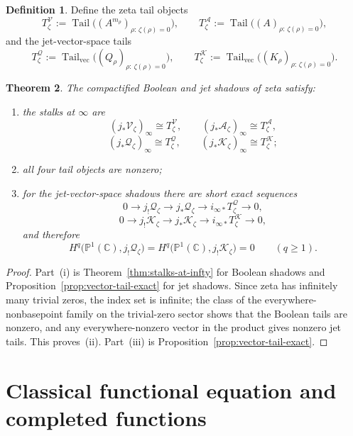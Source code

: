 \documentclass[11pt,a4paper]{article}
\numberwithin{equation}{section}
\newtheorem{theorem}{Theorem}[section]
\theoremstyle{definition}
\newtheorem{definition}[theorem]{Definition}
\theoremstyle{remark}
\DeclareMathOperator{\Tail}{Tail}
\newcommand{\CC}{\mathbb C}
\newcommand{\PP}{\mathbb P}
\newcommand{\cV}{\mathcal V}
\newcommand{\cA}{\mathcal A}
\newcommand{\cQ}{\mathcal Q}
\newcommand{\cK}{\mathcal K}
\begin{document}
\begin{definition}
Define the zeta tail objects
\[
T_\zeta^{\cV}:=\Tail\bigl((A^{m_\rho})_{\rho:\,\zeta(\rho)=0}\bigr),
\qquad
T_\zeta^{\cA}:=\Tail\bigl((A)_{\rho:\,\zeta(\rho)=0}\bigr),
\]
and the jet-vector-space tails
\[
T_\zeta^{\cQ}:=\Tail_{\mathrm{vec}}\bigl((Q_\rho)_{\rho:\,\zeta(\rho)=0}\bigr),
\qquad
T_\zeta^{\cK}:=\Tail_{\mathrm{vec}}\bigl((K_\rho)_{\rho:\,\zeta(\rho)=0}\bigr).
\]
\end{definition}

\begin{theorem}\label{thm:zeta-tail}
The compactified Boolean and jet shadows of zeta satisfy:
\begin{enumerate}[label=(\roman*)]
\item the stalks at $\infty$ are
\[
(j_*\cV_\zeta)_\infty\cong T_\zeta^{\cV},
\qquad
(j_*\cA_\zeta)_\infty\cong T_\zeta^{\cA},
\]
\[
(j_*\cQ_\zeta)_\infty\cong T_\zeta^{\cQ},
\qquad
(j_*\cK_\zeta)_\infty\cong T_\zeta^{\cK};
\]
\item all four tail objects are nonzero;
\item for the jet-vector-space shadows there are short exact sequences
\[
0\to j_!\cQ_\zeta\to j_*\cQ_\zeta\to i_{\infty*}T_\zeta^{\cQ}\to0,
\]
\[
0\to j_!\cK_\zeta\to j_*\cK_\zeta\to i_{\infty*}T_\zeta^{\cK}\to0,
\]
and therefore
\[
H^q\bigl(\PP^1(\CC),j_!\cQ_\zeta\bigr)=H^q\bigl(\PP^1(\CC),j_!\cK_\zeta\bigr)=0
\qquad(q\ge1).
\]
\end{enumerate}
\end{theorem}

\begin{proof}
Part~(i) is Theorem~\ref{thm:stalks-at-infty} for Boolean shadows and Proposition~\ref{prop:vector-tail-exact} for jet shadows.  Since zeta has infinitely many trivial zeros, the index set is infinite; the class of the everywhere-nonbasepoint family on the trivial-zero sector shows that the Boolean tails are nonzero, and any everywhere-nonzero vector in the product gives nonzero jet tails.  This proves~(ii).  Part~(iii) is Proposition~\ref{prop:vector-tail-exact}.
\end{proof}

\section{Classical functional equation and completed functions}
\end{document}
